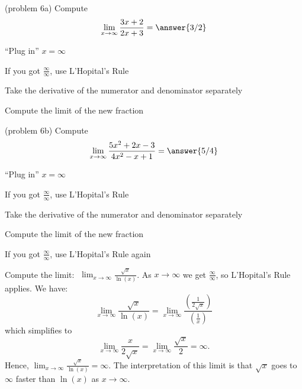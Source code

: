 \documentclass[handout]{ximera}
\begin{document}
\begin{problem}(problem 6a)
  Compute
  \[
  \lim_{x \to \infty} \frac{3x+2}{2x + 3} = \answer{3/2}
  \]
  
    \begin{hint}
      ``Plug in'' $x=\infty$
    \end{hint}
    \begin{hint}
      If you got $\frac{\infty}{\infty}$, use L'Hopital's Rule
    \end{hint}
    \begin{hint}
      Take the derivative of the numerator and denominator separately
    \end{hint}
		\begin{hint}
      Compute the limit of the new fraction
    \end{hint}
	
\end{problem}


\begin{problem}(problem 6b)
  Compute
  \[
  \lim_{x \to \infty} \frac{5x^2 + 2x - 3}{4x^2 - x + 1} = \answer{5/4}
  \]
  
    \begin{hint}
      ``Plug in'' $x=\infty$
    \end{hint}
    \begin{hint}
      If you got $\frac{\infty}{\infty}$, use L'Hopital's Rule
    \end{hint}
    \begin{hint}
      Take the derivative of the numerator and denominator separately
    \end{hint}
		\begin{hint}
      Compute the limit of the new fraction
    \end{hint}
		\begin{hint}
		  If you got $\frac{\infty}{\infty}$, use L'Hopital's Rule again
	  \end{hint}
		
\end{problem}


\begin{example}[example 7]
Compute the limit:  $\displaystyle{\;\lim_{x \to \infty} \frac{\sqrt{x}}{\ln(x)}}$.
As $x \to \infty$ we get $\frac{\infty}{\infty}$, so L'Hopital's Rule applies.
We have:
\[\lim_{x \to \infty} \frac{\sqrt x}{\ln(x)} = 
\lim_{x \to \infty}\frac{\left(\frac{1}{2\sqrt x}\right)}{\left(\frac{1}{x}\right)}\]
which simplifies to 
\[\lim_{x\to\infty} \frac{x}{2\sqrt x} = \lim_{x\to\infty}\frac{\sqrt x}{2} = \infty.\]
Hence, $\lim_{x\to\infty} \frac{\sqrt x}{\ln(x)} = \infty$.
The interpretation of this limit is that $\sqrt x$ goes to $\infty$ faster than $\ln(x)$ as $x\to\infty$.
\end{example}
\end{document}
